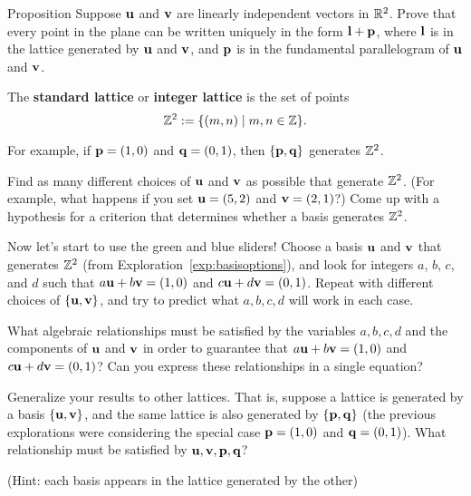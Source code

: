 \begin{toprove}{Proposition}\label{prp:fundpar}
	Suppose $\mathbf{u}$ and $\mathbf{v}$ are linearly independent vectors in $\mathbb{R}^2$. Prove that every point in the plane can be written uniquely in the form $\mathbf{l}+\mathbf{p}$, where $\mathbf{l}$ is in the lattice generated by $\mathbf{u}$ and $\mathbf{v}$, and $\mathbf{p}$ is in the fundamental parallelogram of $\mathbf{u}$ and $\mathbf{v}$.
\end{toprove}
\begin{defn}
	The \textbf{standard lattice} or \textbf{integer lattice} is the set of points
	\[\mathbb{Z}^2:=\{(m,n)\mid m,n\in\mathbb{Z}\}.\]
\end{defn}
For example, if $\mathbf{p}=(1,0)$ and $\mathbf{q}=(0,1)$, then $\{\mathbf{p},\mathbf{q}\}$ generates $\mathbb{Z}^2$.

\begin{explor}\label{exp:basisoptions}
	Find as many different choices of $\mathbf{u}$ and $\mathbf{v}$ as possible that generate $\mathbb{Z}^2$. (For example, what happens if you set $\mathbf{u}=(5,2)$ and $\mathbf{v}=(2,1)$?) Come up with a hypothesis for a criterion that determines whether a basis generates $\mathbb{Z}^2$.
\end{explor}

\begin{explor}
	Now let's start to use the green and blue sliders! Choose a basis $\mathbf{u}$ and $\mathbf{v}$ that generates $\mathbb{Z}^2$ (from Exploration~\ref{exp:basisoptions}), and look for integers $a$, $b$, $c$, and $d$ such that $a\mathbf{u}+b\mathbf{v}=(1,0)$ and $c\mathbf{u}+d\mathbf{v}=(0,1)$. Repeat with different choices of $\{\mathbf{u},\mathbf{v}\}$, and try to predict what $a,b,c,d$ will work in each case.
\end{explor}

\begin{explor}
	What algebraic relationships must be satisfied by the variables $a,b,c,d$ and the components of $\mathbf{u}$ and $\mathbf{v}$ in order to guarantee that $a\mathbf{u}+b\mathbf{v}=(1,0)$ and $c\mathbf{u}+d\mathbf{v}=(0,1)$? Can you express these relationships in a single equation?
\end{explor}

\begin{explor}
	Generalize your results to other lattices. That is, suppose a lattice is generated by a basis $\{\mathbf{u},\mathbf{v}\}$, and the same lattice is also generated by $\{\mathbf{p},\mathbf{q}\}$ (the previous explorations were considering the special case $\mathbf{p}=(1,0)$ and $\mathbf{q}=(0,1)$). What relationship must be satisfied by $\mathbf{u},\mathbf{v},\mathbf{p},\mathbf{q}$?
	
	\color{DarkGreen}(Hint: each basis appears in the lattice generated by the other)
\end{explor}

